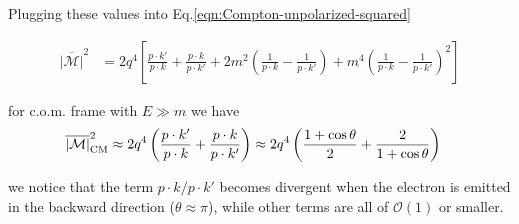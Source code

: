 \documentclass[TheoreticalPhy_ModB.tex]{subfiles}
\begin{document}
Plugging these values into Eq.\eqref{eqn:Compton-unpolarized-squared}

\begin{align*}
\overline{|\mathcal M|}^2
&=2q^4\left[\frac{p\cdot k'}{p\cdot k}+\frac{p\cdot k}{p\cdot k'}+2m^2\left(\frac1{p\cdot k}-\frac1{p\cdot k'}\right)+m^4\left(\frac1{p\cdot k}-\frac1{p\cdot k'}\right)^2\right]
\end{align*}

for c.o.m. frame with $E\gg m$ we have 
\begin{align*}
\overline{|\mathcal M|}_{\textup{CM}}^2
&\approx2q^4\left(\frac{p\cdot k'}{p\cdot k}+\frac{p\cdot k}{p\cdot k'}\right)\approx2q^4\left(\frac{1+\cos\theta}{2}+\frac{2}{1+\cos\theta}\right)
\end{align*}

we notice that the term $p\cdot k/p\cdot k'$ becomes divergent when the electron is emitted in the backward direction ($\theta\approx\pi$), while other terms are all of $\mathcal O(1)$ or smaller.
\end{document}
